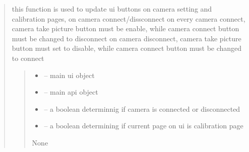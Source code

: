 \documentclass[letterpaper,10pt,english]{sphinxmanual}
\begin{document}
\begin{quote}
\begin{savenotes}\begin{fulllineitems}
\label{\detokenize{setting/backend/camera_funcs:oxin.backend.camera_funcs.update_ui_on_camera_connect_disconnect}}
\pysigstartsignatures
{}
\pysigstopsignatures
\sphinxAtStartPar
this function is used to update ui buttons on camera setting and calibration pages, on camera connect/dissconnect
on every camera connect, camera take picture button must be enable, while camera connect button must be changed to disconnect
on camera disconnect, camera take picture button must set to disable, while camera connect button must be changed to connect
\begin{quote}\begin{description}
\begin{itemize}
\item {} 
\sphinxAtStartPar
{} – main ui object

\item {} 
\sphinxAtStartPar
{} – main api object

\item {} 
\sphinxAtStartPar
{} – a boolean determinnig if camera is connected or disconnected

\item {} 
\sphinxAtStartPar
{} – a boolean determining if current page on ui is calibration page

\end{itemize}

\sphinxAtStartPar
None

\end{description}\end{quote}

\end{fulllineitems}\end{savenotes}



\end{quote}
\end{document}
